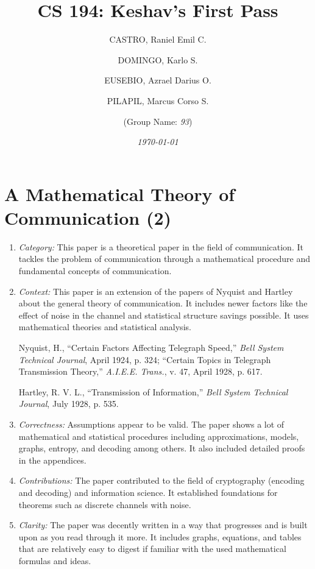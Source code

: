 \documentclass{article}
\title{\textbf{CS 194: Keshav's First Pass}}
\author{
    CASTRO, Raniel Emil C.
    \and
    DOMINGO, Karlo S.
    \and
    EUSEBIO, Azrael Darius O.
    \and
    PILAPIL, Marcus Corso S.
    \and
    (Group Name: \textit{93})
    }
\date{\textit{\today}}
\begin{document}
\maketitle

\section{A Mathematical Theory of Communication (2)}

\begin{enumerate}
    \item \textit{Category:} This paper is a theoretical paper in the field of communication. It tackles the problem of 
    communication through a mathematical procedure and fundamental concepts of communication.
    
    \item \textit{Context:} This paper is an extension of the papers of Nyquist and Hartley about the general theory of
    communication. It includes newer factors like the effect of noise in the channel and statistical
    structure savings possible. It uses mathematical theories and statistical analysis.

    Nyquist, H., “Certain Factors Affecting Telegraph Speed,” \textit{Bell System Technical Journal}, April
    1924, p. 324; “Certain Topics in Telegraph Transmission Theory,” \textit{A.I.E.E. Trans.}, v. 47, April
    1928, p. 617.

    Hartley, R. V. L., “Transmission of Information,” \textit{Bell System Technical Journal}, July 1928, p. 535.

    \item \textit{Correctness:} Assumptions appear to be valid. The paper shows a lot of mathematical and statistical
    procedures including approximations, models, graphs, entropy, and decoding among others. It
    also included detailed proofs in the appendices.
    
    \item \textit{Contributions:} The paper contributed to the field of cryptography (encoding and decoding) and information
    science. It established foundations for theorems such as discrete channels with noise.
    
    \item \textit{Clarity:} The paper was decently written in a way that progresses and is built upon as you read through it
    more. It includes graphs, equations, and tables that are relatively easy to digest if familiar with
    the used mathematical formulas and ideas.
\end{enumerate}
\end{document}

